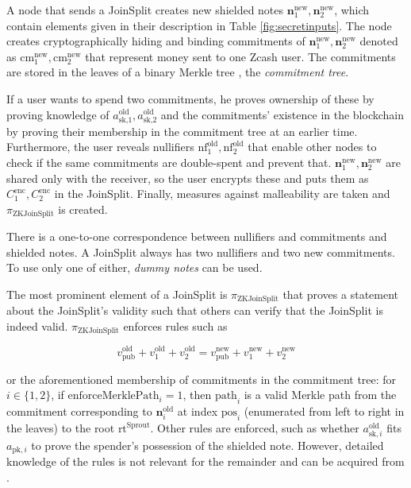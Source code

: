 \documentclass{article}
\begin{document}
A node that sends a JoinSplit creates new shielded notes $\boldsymbol{n}^\text{new}_1,\boldsymbol{n}^\text{new}_2$, which contain elements given in their description in Table \ref{fig:secretinputs}.
The node creates cryptographically hiding and binding commitments of $\boldsymbol{n}^\text{new}_1,\boldsymbol{n}^\text{new}_2$ denoted as $\text{cm}_1^\text{new}, {\text{cm}_2^\text{new}}$ that represent money sent to one Zcash user.
The commitments are stored in the leaves of a binary Merkle tree \cite{merkle:tree}, the \textit{commitment tree}.

If a user wants to spend two commitments, he proves ownership of these by proving knowledge of $a_\text{sk,$1$}^\text{old}, a_\text{sk,$2$}^\text{old}$ and the commitments' existence in the blockchain by proving their membership in the commitment tree at an earlier time.
Furthermore, the user reveals nullifiers $\text{nf}_1^\text{old}, {\text{nf}_2^\text{old}}$ that enable other nodes to check if the same commitments are double-spent and prevent that.
$\boldsymbol{n}^\text{new}_1,\boldsymbol{n}^\text{new}_2$ are shared only with the receiver, so the user encrypts these and puts them as $C_1^\text{enc}, C_2^\text{enc}$ in the JoinSplit.
Finally, measures against malleability are taken and $\pi_\text{ZKJoinSplit}$ is created.

There is a one-to-one correspondence between nullifiers and commitments and shielded notes.
A JoinSplit always has two nullifiers and two new commitments.
To use only one of either, \textit{dummy notes} can be used.

The most prominent element of a JoinSplit is $\pi_\text{ZKJoinSplit}$ that proves a statement about the JoinSplit's validity such that others can verify that the JoinSplit is indeed valid.
$\pi_\text{ZKJoinSplit}$ enforces rules such as

\[v_\text{pub}^\text{old} + v_1^\text{old} + v_2^\text{old} = v_\text{pub}^\text{new} + v_1^\text{new} + v_2^\text{new}\]

or the aforementioned membership of commitments in the commitment tree: for $i \in \{1,2\}$, if $\text{enforceMerklePath}_i = 1$, then $\text{path}_i$ is a valid Merkle path from the commitment corresponding to $\boldsymbol{n}_i^\text{old}$ at index $\text{pos}_i$ (enumerated from left to right in the leaves) to the root $\text{rt}^\text{Sprout}$.
Other rules are enforced, such as whether $a^\text{old}_{\text{sk},i}$ fits $a_{\text{pk},i}$ to prove the spender's possession of the shielded note. However, detailed knowledge of the rules is not relevant for the remainder and can be acquired from \cite{hopwood:zcash}.
\end{document}
